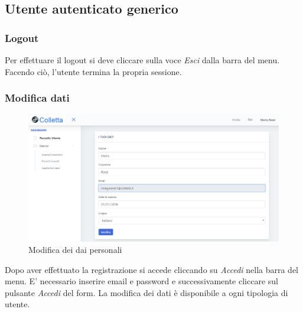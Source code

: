 \subsection{Utente autenticato generico}

    \subsubsection{Logout}
    Per effettuare il {logout} si deve cliccare sulla voce \textit{Esci} dalla barra del menu. Facendo ciò, l'utente termina la propria sessione.
    \subsubsection{Modifica dati}
    	\begin{figure}[H]
        	\centering
        	\includegraphics[width=1\linewidth]{sez/img/autenticazione/modati.PNG} 
        	\caption{Modifica dei dai personali}\label{fig:1}
    	\end{figure}
    Dopo aver effettuato la registrazione si accede cliccando su \textit{Accedi} nella barra del menu. E' necessario inserire email e password e successivamente cliccare sul pulsante \textit{Accedi} del form. La modifica dei dati è disponibile a ogni tipologia di utente.

\newpage

